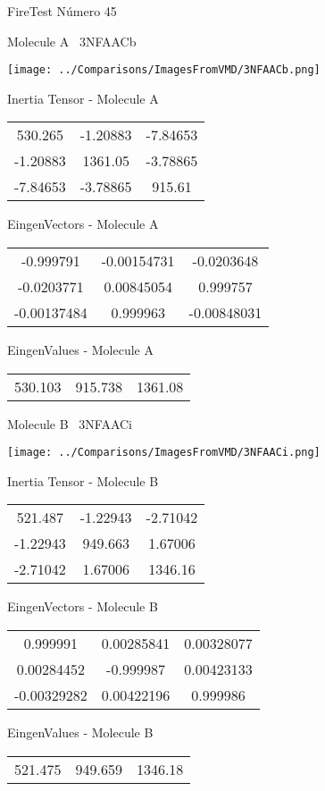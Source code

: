 \vtab[-3cm]
\begin{center}
{\large FireTest \tab Número 45}
\end{center}
\begin{multicols}{2}
\begin{center}

Molecule A \
3NFAACb

\texttt{[image: ../Comparisons/ImagesFromVMD/3NFAACb.png]}

Inertia Tensor - Molecule A \\
\begin{tabular}{|c c c|}
530.265	 & 	-1.20883	 & 	-7.84653	 \\
-1.20883	 & 	1361.05	 & 	-3.78865	 \\
-7.84653	 & 	-3.78865	 & 	915.61
\end{tabular}

\vtab
 EingenVectors - Molecule A     \\
\begin{tabular}{|c c c|}
-0.999791	 & 	-0.00154731	 & 	-0.0203648	 \\
-0.0203771	 & 	0.00845054	 & 	0.999757	 \\
-0.00137484	 & 	0.999963	 & 	-0.00848031
\end{tabular}

\vtab
 EingenValues - Molecule A     \\
\begin{tabular}{|c c c|}
530.103	 & 	915.738	 & 	1361.08	 \\
\end{tabular}
\columnbreak

Molecule B \
3NFAACi

\texttt{[image: ../Comparisons/ImagesFromVMD/3NFAACi.png]}

Inertia Tensor - Molecule B \\
\begin{tabular}{|c c c|}
521.487	 & 	-1.22943	 & 	-2.71042	 \\
-1.22943	 & 	949.663	 & 	1.67006	 \\
-2.71042	 & 	1.67006	 & 	1346.16
\end{tabular}

\vtab
 EingenVectors - Molecule B     \\
\begin{tabular}{|c c c|}
0.999991	 & 	0.00285841	 & 	0.00328077	 \\
0.00284452	 & 	-0.999987	 & 	0.00423133	 \\
-0.00329282	 & 	0.00422196	 & 	0.999986
\end{tabular}

\vtab
 EingenValues - Molecule B     \\
\begin{tabular}{|c c c|}
521.475	 & 	949.659	 & 	1346.18	 \\
\end{tabular}

\end{center}
\end{multicols}

